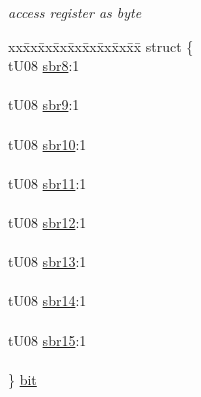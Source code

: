 \begin{DoxyCompactItemize}
\begin{DoxyCompactList}\small\item\em access register as byte \end{DoxyCompactList}\item 
\hypertarget{unionu_s_c_i_b_d_h_aca5b14cc25ca7c9532fe63e7868f9995}{}\begin{tabbing}
xx\=xx\=xx\=xx\=xx\=xx\=xx\=xx\=xx\=\kill
struct \{\\
\>tU08 \hyperlink{unionu_s_c_i_b_d_h_ae6551167218520d6dfcd6e1d7881aa91}{sbr8}:1\\
\>\\
\>tU08 \hyperlink{unionu_s_c_i_b_d_h_a86aea577941045eca0052976ebd84325}{sbr9}:1\\
\>\\
\>tU08 \hyperlink{unionu_s_c_i_b_d_h_a13a40655a8b52aa952d158dc00688a5f}{sbr10}:1\\
\>\\
\>tU08 \hyperlink{unionu_s_c_i_b_d_h_a67a1ca8dcfc857dc6aaf70a4ea594edc}{sbr11}:1\\
\>\\
\>tU08 \hyperlink{unionu_s_c_i_b_d_h_ab29e2200558aa5e0d69ef69465bc34fd}{sbr12}:1\\
\>\\
\>tU08 \hyperlink{unionu_s_c_i_b_d_h_ac7fdce478bd554635fc4ac4ae8d4e3db}{sbr13}:1\\
\>\\
\>tU08 \hyperlink{unionu_s_c_i_b_d_h_ada59bf652d89b6c8a59d501719b0912f}{sbr14}:1\\
\>\\
\>tU08 \hyperlink{unionu_s_c_i_b_d_h_a50bde3bf903bbf3e0f18737afb080939}{sbr15}:1\\
\>\\
\} \hyperlink{unionu_s_c_i_b_d_h_aca5b14cc25ca7c9532fe63e7868f9995}{bit}\label{unionu_s_c_i_b_d_h_aca5b14cc25ca7c9532fe63e7868f9995}
\\


\end{tabbing}
\end{DoxyCompactItemize}
